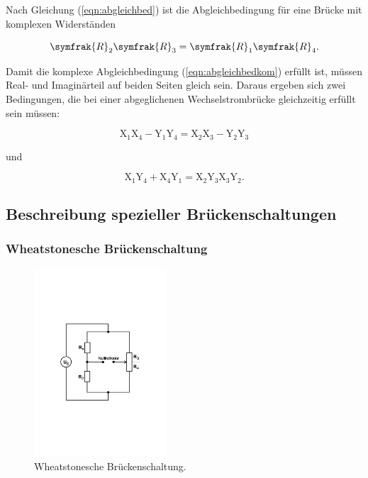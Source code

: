 \noindent
Nach Gleichung (\ref{eqn:abgleichbed}) ist die Abgleichbedingung für eine Brücke mit komplexen Widerständen 

\begin{equation}
\symfrak{R}_2 \symfrak{R}_3 = \symfrak{R}_1 \symfrak{R}_4 .
\label{eqn:abgleichbedkom}
\end{equation}

\noindent
Damit die komplexe Abgleichbedingung (\ref{eqn:abgleichbedkom}) erfüllt ist, müssen Real- und Imaginärteil auf beiden Seiten gleich sein.
Daraus ergeben sich zwei Bedingungen, die bei einer abgeglichenen Wechselstrombrücke gleichzeitig erfüllt sein müssen:

\begin{equation}
\text{X}_1 \text{X}_4 - \text{Y}_1 \text{Y}_4 = \text{X}_2 \text{X}_3 - \text{Y}_2 \text{Y}_3
\label{eqn:abgleichbed1}
\end{equation}

\noindent
und 

\begin{equation}
\text{X}_1 \text{Y}_4 + \text{X}_4 \text{Y}_1 = \text{X}_2 \text{Y}_3 \text{X}_3 \text{Y}_2  .
\label{eqn:abgleichbed2}
\end{equation}

\newpage
\subsection{Beschreibung spezieller Brückenschaltungen}

\subsubsection{Wheatstonesche Brückenschaltung}

\begin{figure}
            \centering
               \includegraphics[height=7cm]{Bilder/wheatstone.pdf}
               \caption{Wheatstonesche Brückenschaltung.}
               \label{fig:wheat}
        \end{figure}

